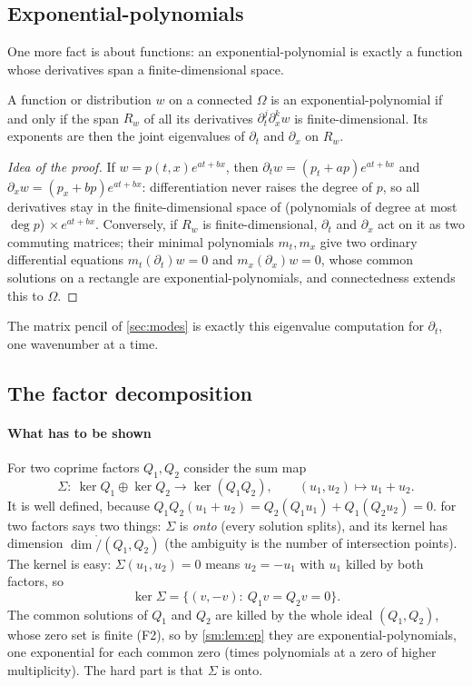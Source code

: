 \subsection{Exponential-polynomials}\label{sm:ep}
One more fact is about functions: an exponential-polynomial is exactly a function whose derivatives span a
finite-dimensional space.
\begin{lemma}\label{sm:lem:ep}
A function or distribution $w$ on a connected $\Omega$ is an exponential-polynomial if and only if the span $R_w$ of all
its derivatives $\partial_t^j\partial_x^kw$ is finite-dimensional. Its exponents are then the joint eigenvalues of
$\partial_t$ and $\partial_x$ on $R_w$.
\end{lemma}
\begin{proof}[Idea of the proof]
If $w=p(t,x)e^{at+bx}$, then $\partial_tw=(p_t+ap)e^{at+bx}$ and $\partial_xw=(p_x+bp)e^{at+bx}$: differentiation never
raises the degree of $p$, so all derivatives stay in the finite-dimensional space of (polynomials of degree at most
$\deg p$)$\,\times e^{at+bx}$. Conversely, if $R_w$ is finite-dimensional, $\partial_t$ and $\partial_x$ act on it as two
commuting matrices; their minimal polynomials $m_t,m_x$ give two ordinary differential equations $m_t(\partial_t)w=0$
and $m_x(\partial_x)w=0$, whose common solutions on a rectangle are exponential-polynomials, and connectedness extends
this to $\Omega$.
\end{proof}
The matrix pencil of \cref{sec:modes} is exactly this eigenvalue computation for $\partial_t$, one wavenumber at a time.

\subsection{The factor decomposition}\label{sm:proof-factor}
\paragraph{What has to be shown} For two coprime factors $Q_1,Q_2$ consider the sum map
\[
  \Sigma:\ \ker Q_1\oplus\ker Q_2\to\ker(Q_1Q_2),\qquad (u_1,u_2)\mapsto u_1+u_2 .
\]
It is well defined, because $Q_1Q_2(u_1+u_2)=Q_2(Q_1u_1)+Q_1(Q_2u_2)=0$.  for two factors says two
things: $\Sigma$ is \emph{onto} (every solution splits), and its kernel has dimension $\dim\ring/(Q_1,Q_2)$ (the
ambiguity is the number of intersection points). The kernel is easy: $\Sigma(u_1,u_2)=0$ means $u_2=-u_1$ with $u_1$
killed by both factors, so
\[
  \ker\Sigma=\{(v,-v):\ Q_1v=Q_2v=0\}.
\]
The common solutions of $Q_1$ and $Q_2$ are killed by the whole ideal $(Q_1,Q_2)$, whose zero set is finite (F2), so by
\cref{sm:lem:ep} they are exponential-polynomials, one exponential for each common zero (times polynomials at a zero of
higher multiplicity). The hard part is that $\Sigma$ is onto.


